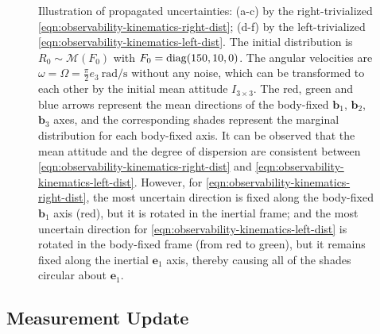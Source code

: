 \begin{figure}
	\caption{Illustration of propagated uncertainties: (a-c) by the right-trivialized \eqref{eqn:observability-kinematics-right-dist}; (d-f) by the left-trivialized \eqref{eqn:observability-kinematics-left-dist}.
		The initial distribution is $R_0 \sim \mathcal{M}(F_0)$ with $F_0 = \mathrm{diag}(150, 10, 0)$.
		The angular velocities are $\omega = \Omega = \tfrac{\pi}{2}e_3 \SI{}{\radian\per\second}$ without any noise, which can be transformed to each other by the initial mean attitude $I_{3\times 3}$.
		The red, green and blue arrows represent the mean directions of the body-fixed $\bm{b}_1$, $\bm{b}_2$, $\bm{b}_3$ axes, and the corresponding shades represent the marginal distribution for each body-fixed axis.
		It can be observed that the mean attitude and the degree of dispersion are consistent between \eqref{eqn:observability-kinematics-right-dist} and \eqref{eqn:observability-kinematics-left-dist}.
		However, for \eqref{eqn:observability-kinematics-right-dist}, the most uncertain direction is fixed along the body-fixed $\bm{b}_1$ axis (red), but it is rotated in the inertial frame; and the most uncertain direction for \eqref{eqn:observability-kinematics-left-dist} is rotated in the body-fixed frame (from red to green), but it remains fixed along the inertial $\bm{e}_1$ axis, thereby causing all of the shades circular about $\bm{e}_1$.
	}
	\label{fig:observability-kinematics}
\end{figure}

\subsection{Measurement Update} \label{section:observability-measurement}

